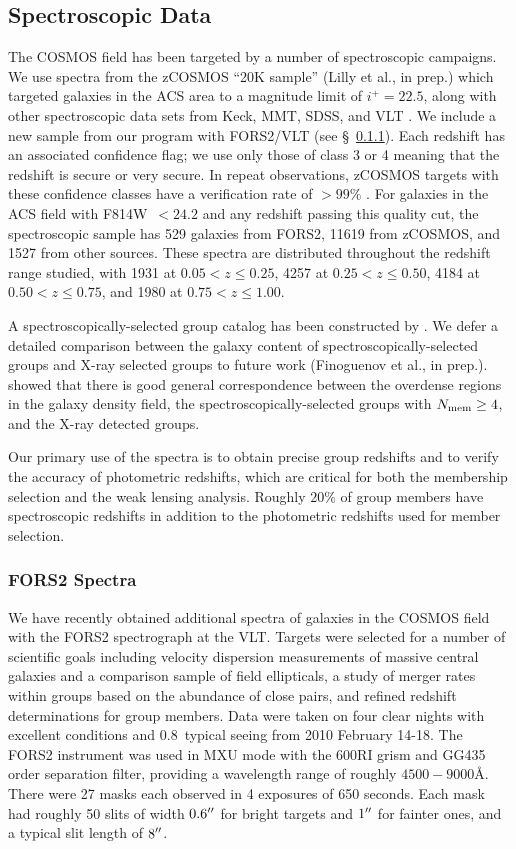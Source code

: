 \subsection{Spectroscopic Data}
\label{cat_s:spectroscopy}

The COSMOS field has been targeted by a number of spectroscopic
campaigns. We use spectra from the zCOSMOS
``20K sample'' (Lilly et al., in prep.) which targeted galaxies in the ACS area to a
magnitude limit of $i^{+}=22.5$, along with other spectroscopic data
sets from Keck, MMT, SDSS, and VLT \citep{Prescott2006, Capak2010}. We
include a new sample from our 
program with FORS2/VLT (see \S~\ref{cat_s:fors2}). Each redshift has
an associated confidence flag; we use only those of class 3 or 4 meaning that the
redshift is secure or very secure. In repeat observations, zCOSMOS
targets with these confidence classes have a verification rate of
$>99\%$ \citep{Lilly2007}. For galaxies in the ACS field with F814W~$<24.2$ and any
redshift passing this quality cut, the spectroscopic sample has 529
galaxies from FORS2, 11619 from zCOSMOS, and 1527 from 
other sources. These spectra are distributed throughout the redshift
range studied, with 1931 at $0.05<z\le0.25$, 4257 at
$0.25<z\le0.50$, 4184 at $0.50<z\le0.75$, and 1980 at
$0.75<z\le1.00$.

A spectroscopically-selected group catalog has been constructed by
\citet{Knobel2009}. We defer a detailed comparison between the
galaxy content of spectroscopically-selected groups and X-ray selected
groups to future work (Finoguenov et al., in prep.). \citet{Kovac2010a}
showed that there is good general correspondence between the overdense
regions in the galaxy density field, the spectroscopically-selected
groups with $N_{\rm mem}\ge4$, and the X-ray detected groups.

Our primary use of the spectra is to obtain precise group redshifts and to
verify the accuracy of photometric redshifts, which are critical for
both the membership selection and the weak lensing analysis. Roughly
$20\%$ of group members have spectroscopic redshifts in addition to
the photometric redshifts used for member selection. 

\subsubsection{FORS2 Spectra}
\label{cat_s:fors2}
We have recently obtained additional spectra of galaxies in the COSMOS
field with the FORS2 spectrograph at the VLT. Targets were selected
for a number of scientific goals including velocity dispersion
measurements of massive central galaxies and a comparison sample of field ellipticals, a
study of merger rates within groups based on the abundance of close
pairs, and refined redshift determinations for 
group members. Data were taken on four clear nights with excellent
conditions and 0.8\arcsec\ typical seeing from 2010 February 14-18. The
FORS2 instrument was used in MXU mode with the 600RI grism and GG435
order separation filter, providing a wavelength range of roughly
$4500-9000$\AA. There were 27 masks each observed in 4 exposures of
650 seconds. Each mask had roughly 50 slits of width $0.6\mbox{$^{\prime\prime}$}$ for
bright targets and $1\mbox{$^{\prime\prime}$}$ for fainter ones, and a typical slit
length of $8\mbox{$^{\prime\prime}$}$.

